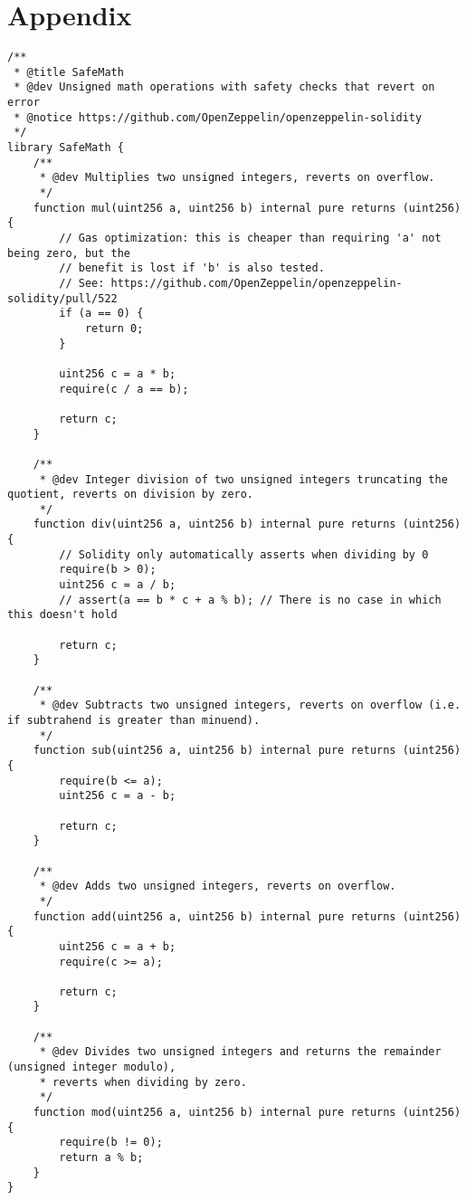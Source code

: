\section{Appendix}
\label{sec:appendix}

\lstset{numbers=left,numberblanklines=true,escapeinside=||}

\let\origthelstnumber\thelstnumber
\makeatletter
\newcommand*\Suppressnumber{%
  \lst@AddToHook{OnNewLine}{%
    \let\thelstnumber\relax%
     \advance\c@lstnumber-\@ne\relax%
    }%
}

\newcommand*\Reactivatenumber[1]{%
  \setcounter{lstnumber}{\numexpr#1-1\relax}
  \lst@AddToHook{OnNewLine}{%
   \let\thelstnumber\origthelstnumber%
   \refstepcounter{lstnumber}
  }%
}

\begin{lstlisting}[language=Solidity, caption={SafeMath library}, label={lis:safemath}, firstnumber=3]
/**
 * @title SafeMath
 * @dev Unsigned math operations with safety checks that revert on error
 * @notice https://github.com/OpenZeppelin/openzeppelin-solidity
 */
library SafeMath {
    /**
     * @dev Multiplies two unsigned integers, reverts on overflow.
     */
    function mul(uint256 a, uint256 b) internal pure returns (uint256) {
        // Gas optimization: this is cheaper than requiring 'a' not being zero, but the
        // benefit is lost if 'b' is also tested.
        // See: https://github.com/OpenZeppelin/openzeppelin-solidity/pull/522
        if (a == 0) {
            return 0;
        }

        uint256 c = a * b;
        require(c / a == b);

        return c;
    }

    /**
     * @dev Integer division of two unsigned integers truncating the quotient, reverts on division by zero.
     */
    function div(uint256 a, uint256 b) internal pure returns (uint256) {
        // Solidity only automatically asserts when dividing by 0
        require(b > 0);
        uint256 c = a / b;
        // assert(a == b * c + a % b); // There is no case in which this doesn't hold

        return c;
    }

    /**
     * @dev Subtracts two unsigned integers, reverts on overflow (i.e. if subtrahend is greater than minuend).
     */
    function sub(uint256 a, uint256 b) internal pure returns (uint256) {
        require(b <= a);
        uint256 c = a - b;

        return c;
    }

    /**
     * @dev Adds two unsigned integers, reverts on overflow.
     */
    function add(uint256 a, uint256 b) internal pure returns (uint256) {
        uint256 c = a + b;
        require(c >= a);

        return c;
    }

    /**
     * @dev Divides two unsigned integers and returns the remainder (unsigned integer modulo),
     * reverts when dividing by zero.
     */
    function mod(uint256 a, uint256 b) internal pure returns (uint256) {
        require(b != 0);
        return a % b;
    }
}
\end{lstlisting}


